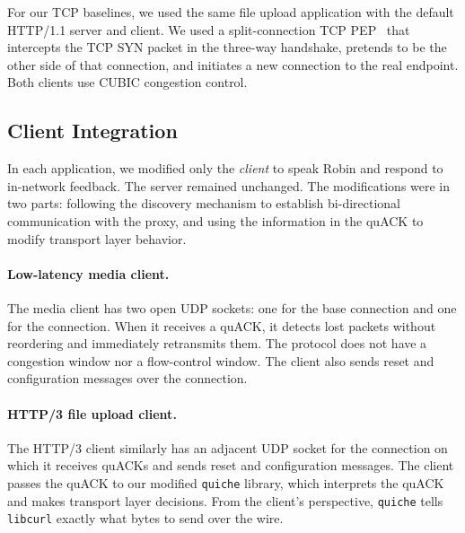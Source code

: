 For our TCP baselines, we used the same file upload application with the
default HTTP/1.1 server and client. We used a split-connection
TCP PEP~\cite{caini2006pepsal} that intercepts the TCP
SYN packet in the three-way handshake, pretends to be the other side of that
connection, and initiates a new connection to the real endpoint.
Both clients use CUBIC congestion control.

\subsection{Client Integration}

In each application, we modified only the \emph{client} to speak Robin
and respond to in-network feedback. The server remained unchanged.
The modifications were in two parts: following the discovery mechanism to
establish bi-directional communication with the proxy, and using the information
in the quACK to modify transport layer behavior.




\paragraph{Low-latency media client.} The media client has two open UDP sockets:
one for the base connection and one for the \sys connection. When it receives a
quACK, it detects lost packets without reordering and immediately retransmits
them. The protocol does not have a congestion window nor a flow-control window.
The client also sends reset and configuration messages over the \sys connection.

\paragraph{HTTP/3 file upload client.}
The HTTP/3 client similarly has an adjacent UDP socket for the \sys connection on
which it receives quACKs and sends reset and configuration messages. The client
passes the quACK to our modified \texttt{quiche} library, which interprets the
quACK and makes transport layer decisions. From the client's perspective,
\texttt{quiche} tells \texttt{libcurl} exactly what bytes to send over the wire.

